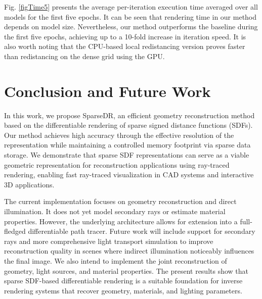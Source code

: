 \documentclass{ieeeaccess}
\begin{document}
Fig. \ref{figTime5} presents the average per-iteration execution time averaged over all models for the first five epochs. It can be seen that rendering time in our method depends on model size. Nevertheless, our method outperforms the baseline during the first five epochs, achieving up to a 10-fold increase in iteration speed. It is also worth noting that the CPU-based local redistancing version proves faster than redistancing on the dense grid using the GPU.

\section{Conclusion and Future Work}

In this work, we propose SparseDR, an efficient geometry reconstruction method based on the differentiable rendering of sparse signed distance functions (SDFs). Our method achieves high accuracy through the effective resolution of the representation while maintaining a controlled memory footprint via sparse data storage. We demonstrate that sparse SDF representations can serve as a viable geometric representation for reconstruction applications using ray-traced rendering, enabling fast ray-traced visualization in CAD systems and interactive 3D applications.

The current implementation focuses on geometry reconstruction and direct illumination. It does not yet model secondary rays or estimate material properties. However, the underlying architecture allows for extension into a full-fledged differentiable path tracer. Future work will include support for secondary rays and more comprehensive light transport simulation to improve reconstruction quality in scenes where indirect illumination noticeably influences the final image. We also intend to implement the joint reconstruction of geometry, light sources, and material properties. The present results show that sparse SDF-based differentiable rendering is a suitable foundation for inverse rendering systems that recover geometry, materials, and lighting parameters.

\end{document}
